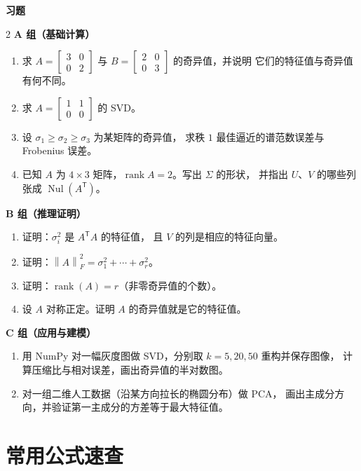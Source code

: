 \documentclass[11pt,a4paper,openany]{ctexbook}
\DeclareMathOperator{\rank}{rank}
\DeclareMathOperator{\Nul}{Nul}
\newcommand{\norm}[1]{\left\lVert #1 \right\rVert}
\newcommand{\exhead}{%
  \par\addvspace{12pt}%
  {\noindent\sffamily\bfseries\Large\color{qing} 习题\par}%
  \vspace{-4pt}\noindent{\color{qing!32}\rule{\linewidth}{0.7pt}}\par\vspace{6pt}}
\begin{document}
\exhead
\begin{multicols}{2}
\small
\textbf{A 组（基础计算）}
\begin{enumerate}[leftmargin=1.6em, itemsep=3pt]
\item 求 $A=\begin{bmatrix}3&0\\0&2\end{bmatrix}$ 与
      $B=\begin{bmatrix}2&0\\0&3\end{bmatrix}$ 的奇异值，并说明
      它们的特征值与奇异值有何不同。
\item 求 $A=\begin{bmatrix}1&1\\0&0\end{bmatrix}$ 的 SVD。
\item 设 $\sigma_1\ge\sigma_2\ge\sigma_3$ 为某矩阵的奇异值，
      求秩 $1$ 最佳逼近的谱范数误差与 Frobenius 误差。
\item 已知 $A$ 为 $4\times 3$ 矩阵，$\rank A=2$。写出 $\Sigma$ 的形状，
      并指出 $U$、$V$ 的哪些列张成 $\Nul(A^{\mathsf T})$。
\end{enumerate}
\textbf{B 组（推理证明）}
\begin{enumerate}[leftmargin=1.6em, itemsep=3pt, start=5]
\item 证明：$\sigma_i^2$ 是 $A^{\mathsf T}A$ 的特征值，
      且 $V$ 的列是相应的特征向量。
\item 证明：$\norm{A}_F^2=\sigma_1^2+\cdots+\sigma_r^2$。
\item 证明：$\rank(A)=r$（非零奇异值的个数）。
\item 设 $A$ 对称正定。证明 $A$ 的奇异值就是它的特征值。
\end{enumerate}
\textbf{C 组（应用与建模）}
\begin{enumerate}[leftmargin=1.6em, itemsep=3pt, start=9]
\item 用 NumPy 对一幅灰度图做 SVD，分别取 $k=5,20,50$ 重构并保存图像，
      计算压缩比与相对误差，画出奇异值的半对数图。
\item 对一组二维人工数据（沿某方向拉长的椭圆分布）做 PCA，
      画出主成分方向，并验证第一主成分的方差等于最大特征值。
\end{enumerate}
\end{multicols}


\appendix
\chapter{常用公式速查}
\label{app:formula}
\end{document}

